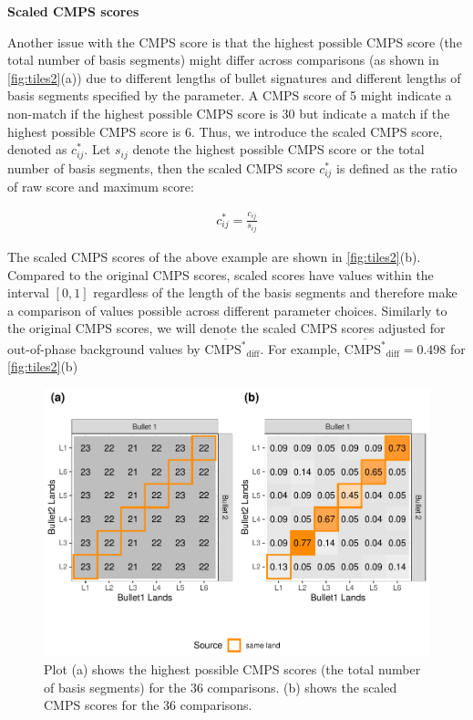 \textbf{Scaled CMPS scores}

Another issue with the CMPS score is that the highest possible CMPS
score (the total number of basis segments) might differ across
comparisons (as shown in \autoref{fig:tiles2}(a)) due to different
lengths of bullet signatures and different lengths of basis segments
specified by the parameter. A CMPS score of 5 might indicate a non-match
if the highest possible CMPS score is 30 but indicate a match if the
highest possible CMPS score is 6. Thus, we introduce the scaled CMPS
score, denoted as \(c^*_{ij}\). Let \(s_{ij}\) denote the highest
possible CMPS score or the total number of basis segments, then the
scaled CMPS score \(c^*_{ij}\) is defined as the ratio of raw score and
maximum score:

\begin{align}
c^*_{ij} = \frac{c_{ij}}{s_{ij}}
\end{align}

The scaled CMPS scores of the above example are shown in
\autoref{fig:tiles2}(b). Compared to the original CMPS scores, scaled
scores have values within the interval \([0, 1]\) regardless of the
length of the basis segments and therefore make a comparison of values
possible across different parameter choices. Similarly to the original
CMPS scores, we will denote the scaled CMPS scores adjusted for
out-of-phase background values by \(\mathrm{\overline{CMPS^*}_{diff}}\).
For example, \(\mathrm{\overline{CMPS^*}_{diff}} = 0.498\) for
\autoref{fig:tiles2}(b)

\begin{Schunk}
\begin{figure}

{\centering \includegraphics[width=.7\textwidth]{ju-hofmann_files/figure-latex/tiles2-1} 

}

\caption[Plot (a) shows the highest possible CMPS scores (the total number of basis segments) for the 36 comparisons]{Plot (a) shows the highest possible CMPS scores (the total number of basis segments) for the 36 comparisons. (b) shows the scaled CMPS scores for the 36 comparisons.}\label{fig:tiles2}
\end{figure}
\end{Schunk}

